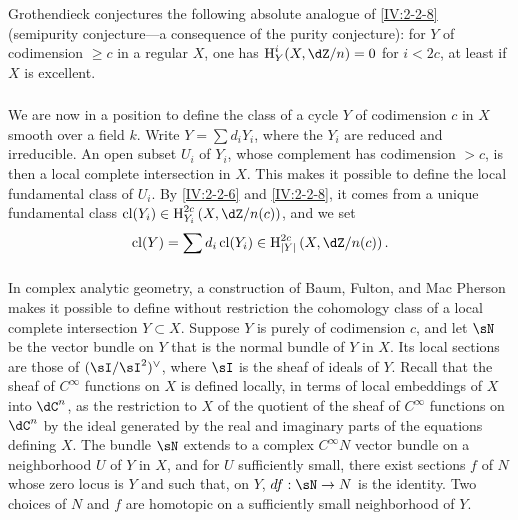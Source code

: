 \subsubsection{}\label{IV:2-2-9}

Grothendieck conjectures the following absolute analogue of
\ref{IV:2-2-8} (semipurity conjecture---a consequence of the purity
conjecture): for $Y$ of codimension $\geqslant c$ in a regular $X$, one has
$\h_Y^i(X,\dZ/n)=0$ for $i<2 c$, at least if $X$ is excellent.






\subsubsection{}\label{IV:2-2-10}

We are now in a position to define the class of a cycle $Y$ of codimension
$c$ in $X$ smooth over a field $k$. Write $Y=\sum d_i Y_i$, where the $Y_i$
are reduced and irreducible. An open subset $U_i$ of $Y_i$, whose complement
has codimension $>c$, is then a local complete intersection in $X$. This
makes it possible to define the local fundamental class of $U_i$. By
\ref{IV:2-2-6} and \ref{IV:2-2-8}, it comes from a unique fundamental class
$\cl(Y_i)\in \h_{Y_i}^{2 c}\left(X,\dZ/n(c)\right)$, and we set
\[
  \cl(Y) = \sum d_i \cl(Y_i) \in \h_{|Y|}^{2 c}\left(X,\dZ/n(c)\right) \text{.}
\]






\subsubsection{}\label{IV:2-2-11}

In complex analytic geometry, a construction of Baum, Fulton, and
Mac Pherson \cite{bfm75} makes it possible to define without restriction the
cohomology class of a local complete intersection $Y\subset X$. Suppose $Y$
is purely of codimension $c$, and let $\sN$ be the vector bundle on $Y$ that
is the normal bundle of $Y$ in $X$. Its local sections are those of
$(\sI/\sI^2)^\vee$, where $\sI$ is the sheaf of ideals of $Y$. Recall that
the sheaf of $C^\infty$ functions on $X$ is defined locally, in terms of local
embeddings of $X$ into $\dC^n$, as the restriction to $X$ of the quotient of
the sheaf of $C^\infty$ functions on $\dC^n$ by the ideal generated by the
real and imaginary parts of the equations defining $X$. The bundle $\sN$
extends to a complex $C^\infty N$ vector bundle on a neighborhood $U$ of
$Y$ in $X$, and for $U$ sufficiently small, there exist sections $f$ of $N$
whose zero locus is $Y$ and such that, on $Y$, $d f:\sN\to N$ is the
identity. Two choices of $N$ and $f$ are homotopic on a sufficiently small
neighborhood of $Y$.

